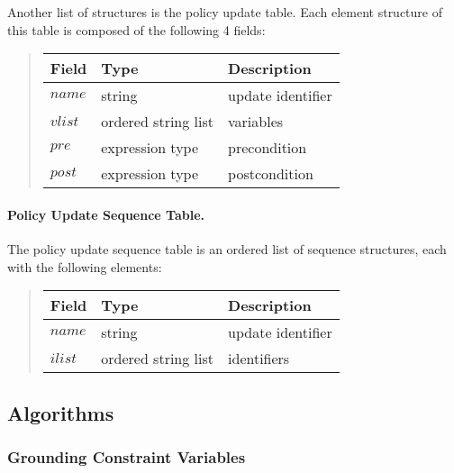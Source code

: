 \documentclass[10pt, twocolumn]{article}
\begin{document}
            Another list of structures is the policy update table. Each element
            structure of this table is composed of the following 4 fields:

            \begin{quote}
              \begin{tabular}[t]{|l|l|l|}
                \hline
                \textbf{Field} & \textbf{Type} & \textbf{Description} \\
                \hline
                $name$ & string & update identifier \\
                \hline
                $vlist$ & ordered string list & variables \\
                \hline
                $pre$ & expression type & precondition \\
                \hline
                $post$ & expression type & postcondition \\
                \hline
              \end{tabular}
            \end{quote}

        \paragraph{Policy Update Sequence Table.}

          The policy update sequence table is an ordered list of sequence
          structures, each with the following elements:

          \begin{quote}
            \begin{tabular}[t]{|l|l|l|}
              \hline
              \textbf{Field} & \textbf{Type} & \textbf{Description} \\
              \hline
              $name$ & string & update identifier \\
              \hline
              $ilist$ & ordered string list & identifiers \\
              \hline
            \end{tabular}
          \end{quote}

    \subsection{Algorithms}

      \subsubsection{Grounding Constraint Variables}
\end{document}
